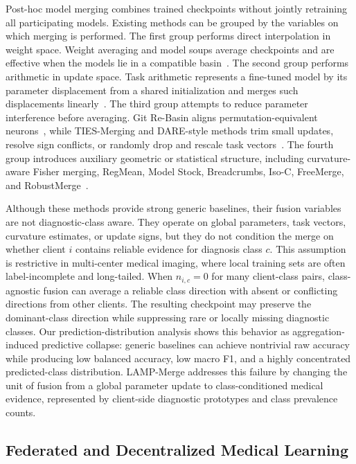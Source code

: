 Post-hoc model merging combines trained checkpoints without jointly retraining all participating models. Existing methods can be grouped by the variables on which merging is performed. The first group performs direct interpolation in weight space. Weight averaging and model soups average checkpoints and are effective when the models lie in a compatible basin~\cite{wortsman2022model}. The second group performs arithmetic in update space. Task arithmetic represents a fine-tuned model by its parameter displacement from a shared initialization and merges such displacements linearly~\cite{ilharco2023task}. The third group attempts to reduce parameter interference before averaging. Git Re-Basin aligns permutation-equivalent neurons~\cite{ainsworth2023git}, while TIES-Merging and DARE-style methods trim small updates, resolve sign conflicts, or randomly drop and rescale task vectors~\cite{yadav2023ties,yu2024dare}. The fourth group introduces auxiliary geometric or statistical structure, including curvature-aware Fisher merging, RegMean, Model Stock, Breadcrumbs, Iso-C, FreeMerge, and RobustMerge~\cite{matena2022fisher,jin2023regmean}.

Although these methods provide strong generic baselines, their fusion variables are not diagnostic-class aware. They operate on global parameters, task vectors, curvature estimates, or update signs, but they do not condition the merge on whether client $i$ contains reliable evidence for diagnosis class $c$. This assumption is restrictive in multi-center medical imaging, where local training sets are often label-incomplete and long-tailed. When $n_{i,c}=0$ for many client-class pairs, class-agnostic fusion can average a reliable class direction with absent or conflicting directions from other clients. The resulting checkpoint may preserve the dominant-class direction while suppressing rare or locally missing diagnostic classes. Our prediction-distribution analysis shows this behavior as aggregation-induced predictive collapse: generic baselines can achieve nontrivial raw accuracy while producing low balanced accuracy, low macro F1, and a highly concentrated predicted-class distribution. LAMP-Merge addresses this failure by changing the unit of fusion from a global parameter update to class-conditioned medical evidence, represented by client-side diagnostic prototypes and class prevalence counts.

\subsection{Federated and Decentralized Medical Learning}

